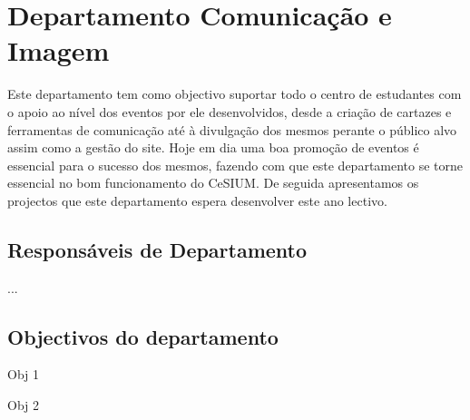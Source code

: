 \section{Departamento Comunicação e Imagem}

\indent	Este departamento tem como objectivo suportar todo o centro de estudantes com o apoio ao nível dos eventos por ele desenvolvidos, desde a criação de cartazes e ferramentas de comunicação até à divulgação dos mesmos perante o público alvo assim como a gestão do site. Hoje em dia uma boa promoção de eventos é essencial para o sucesso dos mesmos, fazendo com que este departamento se torne essencial no bom funcionamento do CeSIUM. De seguida apresentamos os projectos que este departamento espera desenvolver este ano lectivo.

\subsection{Responsáveis de Departamento}
\begin{itemizedash}
	\item ...
\end{itemizedash}

\subsection{Objectivos do departamento}
\lipsum[2]
\begin{itemizedash}
	\item Obj 1
	\item Obj 2
\end{itemizedash}
